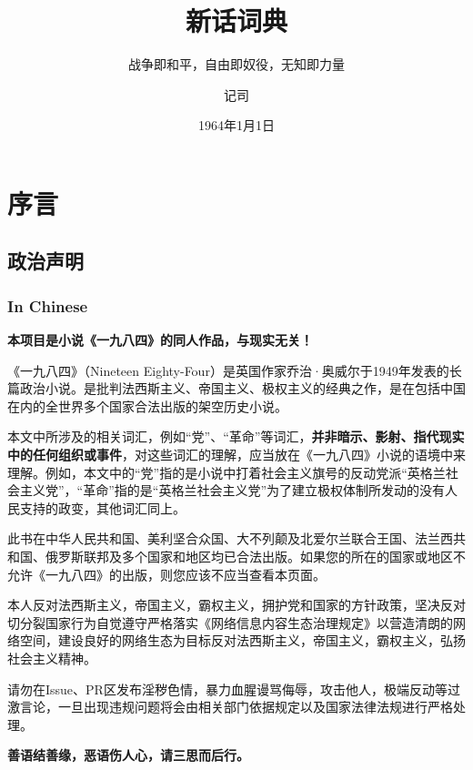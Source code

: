\documentclass[lang=cn, color=black]{elegantbook}
\title{新话词典}
\subtitle{战争即和平，自由即奴役，无知即力量}
\date{1964年1月1日}
\author{记司}
\institute{真部}
\begin{document}
    \maketitle

    \tableofcontents

    \part*{序言}
        \chapter*{政治声明}
            \section*{In Chinese}
                \textbf{本项目是小说《一九八四》的同人作品，与现实无关！}

                《一九八四》（Nineteen Eighty-Four）是英国作家乔治·奥威尔于1949年发表的长篇政治小说。是批判法西斯主义、帝国主义、极权主义的经典之作，是在包括中国在内的全世界多个国家合法出版的架空历史小说。

                本文中所涉及的相关词汇，例如“党”、“革命”等词汇，\textbf{并非暗示、影射、指代现实中的任何组织或事件}，对这些词汇的理解，应当放在《一九八四》小说的语境中来理解。例如，本文中的“党”指的是小说中打着社会主义旗号的反动党派“英格兰社会主义党”，“革命”指的是“英格兰社会主义党”为了建立极权体制所发动的没有人民支持的政变，其他词汇同上。

                此书在中华人民共和国、美利坚合众国、大不列颠及北爱尔兰联合王国、法兰西共和国、俄罗斯联邦及多个国家和地区均已合法出版。如果您的所在的国家或地区不允许《一九八四》的出版，则您应该不应当查看本页面。

                本人反对法西斯主义，帝国主义，霸权主义，拥护党和国家的方针政策，坚决反对切分裂国家行为自觉遵守严格落实《网络信息内容生态治理规定》以营造清朗的网络空间，建设良好的网络生态为目标反对法西斯主义，帝国主义，霸权主义，弘扬社会主义精神。

                请勿在Issue、PR区发布淫秽色情，暴力血腥谩骂侮辱，攻击他人，极端反动等过激言论，一旦出现违规问题将会由相关部门依据规定以及国家法律法规进行严格处理。
                
                \begin{center}
                    \large
                    \textbf{善语结善缘，恶语伤人心，请三思而后行。}
                \end{center}
            
\end{document}

